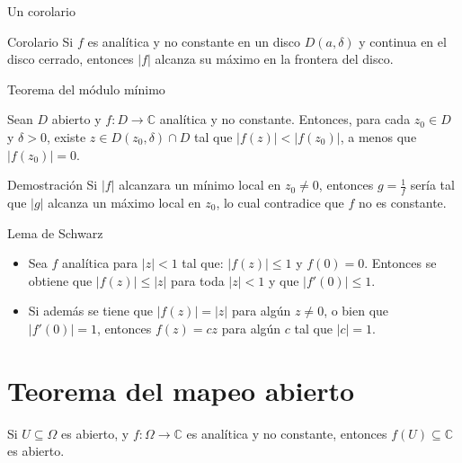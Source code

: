 \documentclass[spanish,presentation]{beamer}
\begin{document}
\begin{frame}[label=sec-1-4]{Un corolario}
\begin{block}{Corolario}
Si \(f\) es analítica y no constante en un disco \(D(a,\delta)\) y
continua en el disco cerrado, entonces \(|f|\) alcanza su máximo
en la frontera del disco.
\end{block}
\end{frame}

\begin{frame}[label=sec-1-5]{Teorema del módulo mínimo}
\begin{theorem}
Sean \(D\) abierto y \(f\colon D\to \mathbb{C}\) analítica y no
constante. Entonces, para cada \(z_{0}\in D\) y \(\delta>0\),
existe \(z\in D(z_{0},\delta)\cap D\) tal que
\(|f(z)|<|f(z_{0})|\), a menos que \(|f(z_{0})|=0\).
\end{theorem}

\begin{block}{Demostración}
Si \(|f|\) alcanzara un mínimo local en \(z_{0}\ne 0\), entonces
\(g=\frac{1}{f}\) sería tal que \(|g|\) alcanza un máximo local en
\(z_{0}\), lo cual contradice que \(f\) no es constante.
\end{block}
\end{frame}


\begin{frame}[label=sec-1-6]{Lema de Schwarz}
\begin{theorem}
\begin{itemize}
\item Sea \(f\) analítica para \(|z|<1\) tal que: \(|f(z)|\leq 1\) y
\(f(0)=0\). Entonces se obtiene que \(|f(z)|\leq|z|\) para toda
\(|z|<1\) y que \(|f'(0)|\leq 1\).
\item Si además se tiene que \(|f(z)|=|z|\) para algún \(z\ne 0\), o
bien que \(|f'(0)|=1\), entonces \(f(z)=cz\) para algún \(c\)
tal que \(|c|=1\).
\end{itemize}
\end{theorem}
\end{frame}


\section{Teorema del mapeo abierto}
\label{sec-2}

\begin{frame}[label=sec-2-1]{}
\begin{theorem}
Si \(U\subseteq\Omega\) es abierto, y \(f\colon\Omega\to
    \mathbb{C}\) es analítica y no constante, entonces \(f(U)\subseteq
    \mathbb{C}\) es abierto. 
\end{theorem}
\end{frame}
\end{document}

